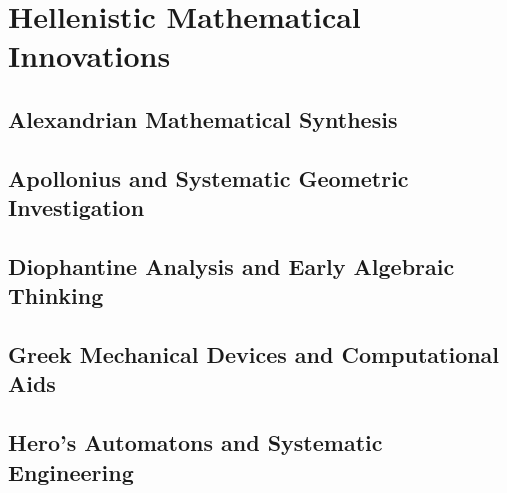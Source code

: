 
\chapter{Hellenistic Mathematical Innovations}

\section{Alexandrian Mathematical Synthesis}

\section{Apollonius and Systematic Geometric Investigation}

\section{Diophantine Analysis and Early Algebraic Thinking}

\section{Greek Mechanical Devices and Computational Aids}

\section{Hero's Automatons and Systematic Engineering}
